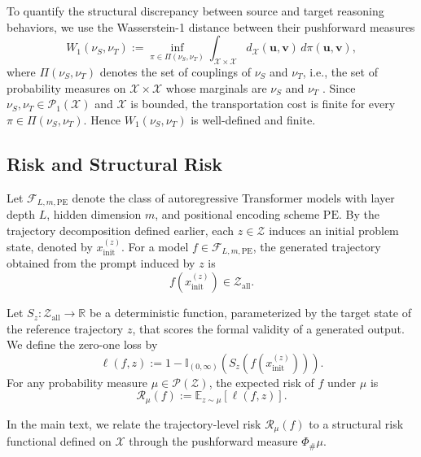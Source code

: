 To quantify the structural discrepancy between source and target reasoning behaviors, we use the Wasserstein-1 distance between their pushforward measures
\begin{equation}
W_1(\nu_S,\nu_T)
:=
\inf_{\pi \in \Pi(\nu_S,\nu_T)}
\int_{\mathcal{X}\times\mathcal{X}}
d_{\mathcal{X}}(\mathbf{u},\mathbf{v})\,d\pi(\mathbf{u},\mathbf{v}),
\end{equation}
where $\Pi(\nu_S,\nu_T)$ denotes the set of couplings of $\nu_S$ and $\nu_T$, i.e., the set of probability measures on $\mathcal{X}\times\mathcal{X}$ whose marginals are $\nu_S$ and $\nu_T$ \citep{Villani2009}. Since $\nu_S,\nu_T\in\mathcal{P}_1(\mathcal X)$ and $\mathcal X$ is bounded, the transportation cost is finite for every $\pi \in \Pi(\nu_S,\nu_T)$. Hence $W_1(\nu_S,\nu_T)$ is well-defined and finite.
\subsection{Risk and Structural Risk}
\label{app:risk}

Let $\mathcal{F}_{L,m,\mathrm{PE}}$ denote the class of autoregressive Transformer models with layer depth $L$, hidden dimension $m$, and positional encoding scheme $\mathrm{PE}$. By the trajectory decomposition defined earlier, each $z \in \mathcal{Z}$ induces an initial problem state, denoted by $x_{\mathrm{init}}^{(z)}$. For a model $f \in \mathcal{F}_{L,m,\mathrm{PE}}$, the generated trajectory obtained from the prompt induced by $z$ is
\begin{equation}
f(x_{\mathrm{init}}^{(z)}) \in \mathcal{Z}_{\mathrm{all}}.
\end{equation}

Let $S_z : \mathcal{Z}_{\mathrm{all}} \to \mathbb{R}$ be a deterministic function, parameterized by the target state of the reference trajectory $z$, that scores the formal validity of a generated output. We define the zero-one loss by
\begin{equation}
\ell(f,z) := 1 - \mathbb{I}_{(0, \infty)}\left(S_z\left(f(x_{\mathrm{init}}^{(z)})\right)\right).
\end{equation}
For any probability measure $\mu \in \mathcal{P}(\mathcal{Z})$, the expected risk of $f$ under $\mu$ is
\begin{equation}
\mathcal{R}_{\mu}(f) := \mathbb{E}_{z\sim\mu}[\ell(f,z)].
\end{equation}

In the main text, we relate the trajectory-level risk $\mathcal{R}_{\mu}(f)$ to a structural risk functional defined on $\mathcal{X}$ through the pushforward measure $\Phi_{\#}\mu$. 

